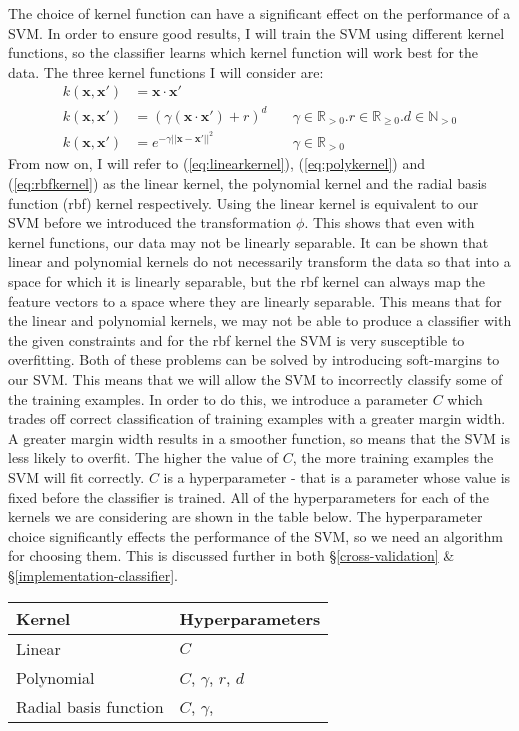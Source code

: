 \documentclass[12pt,a4paper,twoside,openright]{report}
\begin{document}
The choice of kernel function can have a significant effect on the performance of a SVM. In order to ensure good results, I will train the SVM using different kernel functions, so the classifier learns which kernel function will work best for the data. The three kernel functions I will consider are:
\begin{align}
	k(\mathbf{x}, \mathbf{x}') & = \mathbf{x} \cdot \mathbf{x}'& \label{eq:linearkernel} \\
	k(\mathbf{x}, \mathbf{x}') & = (\gamma (\mathbf{x} \cdot \mathbf{x}') + r)^d \quad & \gamma \in \mathbb{R}_{> 0} . r \in \mathbb{R}_{\ge 0} . d \in \mathbb{N}_{> 0} \label{eq:polykernel} \\
	k(\mathbf{x}, \mathbf{x}') & = e^{-\gamma ||\mathbf{x} - \mathbf{x}'||^2} \quad & \gamma \in \mathbb{R}_{> 0} \label{eq:rbfkernel}
\end{align}
From now on, I will refer to (\ref{eq:linearkernel}), (\ref{eq:polykernel}) and (\ref{eq:rbfkernel}) as the linear kernel, the polynomial kernel and the radial basis function (rbf) kernel respectively. Using the linear kernel is equivalent to our SVM before we introduced the transformation $\phi$. This shows that even with kernel functions, our data may not be linearly separable. It can be shown that linear and polynomial kernels do not necessarily transform the data so that into a space for which it is linearly separable, but the rbf kernel can always map the feature vectors to a space where they are linearly separable. This means that for the linear and polynomial kernels, we may not be able to produce a classifier with the given constraints and for the rbf kernel the SVM is very susceptible to overfitting. Both of these problems can be solved by introducing soft-margins to our SVM. This means that we will allow the SVM to incorrectly classify some of the training examples. In order to do this, we introduce a parameter $C$ which trades off correct classification of training examples with a greater margin width. A greater margin width results in a smoother function, so means that the SVM is less likely to overfit. The higher the value of $C$, the more training examples the SVM will fit correctly. $C$ is a hyperparameter - that is a parameter whose value is fixed before the classifier is trained. All of the hyperparameters for each of the kernels we are considering are shown in the table below. The hyperparameter choice significantly effects the performance of the SVM, so we need an algorithm for choosing them. This is discussed further in both \S\ref{cross-validation} \& \S\ref{implementation-classifier}.
\FloatBarrier
\begin{table}[]
	\centering
	\label{hyperparametertable}
	\begin{tabular}{ll}
		\textbf{Kernel}       & \textbf{Hyperparameters} \\ \hline
		Linear                & $C$                      \\
		Polynomial            & $C$, $\gamma$, $r$, $d$  \\
		Radial basis function & $C$, $\gamma$,             
	\end{tabular}
\end{table}
\FloatBarrier
\end{document}
